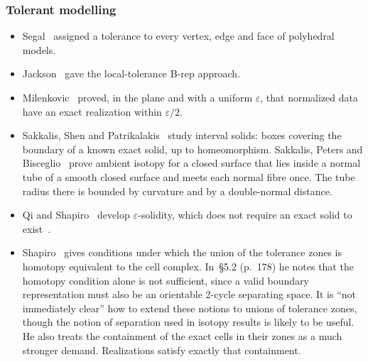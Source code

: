 \subsubsection*{Tolerant modelling}
\begin{itemize}
\item Segal~\cite{Segal90} assigned a tolerance to every vertex, edge and face of polyhedral models.
\item Jackson~\cite{Jackson95} gave the local-tolerance B-rep approach.
\item Milenkovic~\cite{Milenkovic88} proved, in the plane and with a uniform $\varepsilon$, that normalized data have an
exact realization within $\varepsilon/2$.
\item Sakkalis, Shen and Patrikalakis~\cite{SSP01} study interval solids: boxes covering the boundary of a known exact
solid, up to homeomorphism. Sakkalis, Peters and Bisceglio~\cite[Thm.~10]{SPB04} prove ambient isotopy for a closed
surface that lies inside a normal tube of a smooth closed surface and meets each normal fibre once. The tube radius
there is bounded by curvature and by a double-normal distance.
\item Qi and Shapiro~\cite{QiShapiro06} develop $\varepsilon$-solidity, which does not require an exact solid to
exist~\cite{QiShapiro06b}.
\item Shapiro~\cite{Shapiro08} gives conditions under which the union of the tolerance zones is homotopy equivalent
to the cell complex. In~\S5.2 (p.~178) he notes that the homotopy condition alone is not sufficient, since a valid
boundary representation must also be an orientable 2-cycle separating space. It is ``not immediately clear'' how to
extend these notions to unions of tolerance zones, though the notion of separation used in isotopy results is likely
to be useful. He also treats the containment of the exact cells in their zones as a much stronger demand.
Realizations satisfy exactly that containment.
\end{itemize}

